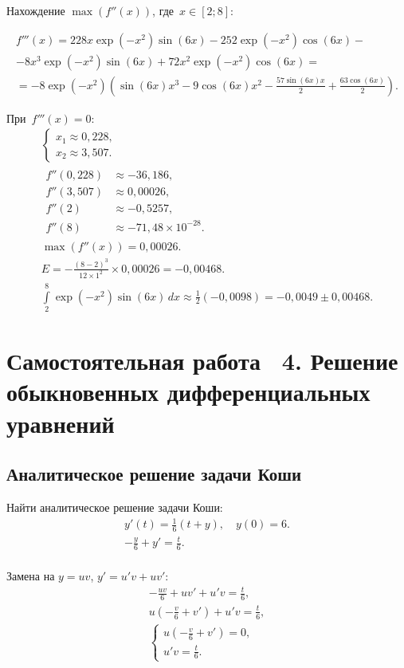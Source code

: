 \documentclass[10pt, a4paper, titlepage]{article}
\begin{document}
Нахождение $\max(f''(x))$, где~$x\in[2; 8]$:

\begin{multline*}
    f'''(x)=228x\exp(-x^2)\sin(6x)-252\exp(-x^2)\cos(6x)- \\
    -8x^3\exp(-x^2)\sin(6x)+72x^2\exp(-x^2)\cos(6x) = \\
    = -8\exp(-x^2)\left(\sin(6x)x^3-9\cos(6x)x^2-\frac{57\sin(6x)x}{2}+\frac{63\cos(6x)}{2}\right) .
\end{multline*}

При~$f'''(x) = 0$:
\begin{gather*}
    \begin{cases}
        x_1 \approx 0,228 ,\\
        x_2 \approx 3,507 .
    \end{cases} 
    \\
    \begin{aligned}
        f''(0,228) &\approx -36,186 ,\\
        f''(3,507) &\approx 0,00026 ,\\
        f''(2) &\approx -0,5257 ,\\
        f''(8) &\approx -71,48\times10^{-28} .
    \end{aligned}
    \\
    \max(f''(x))=0,00026 .\\
    E=-\frac{(8-2)^3}{12\times1^2}\times0,00026=-0,00468 .\\
    \int\limits_2^8 \exp(-x^2)\sin(6x)\,dx \approx \frac{1}{2}(-0,0098)=-0,0049\pm0,00468 .
\end{gather*}


\clearpage
\section{Самостоятельная работа \textnumero~4. Решение обыкновенных дифференциальных уравнений}

\subsection*{Аналитическое решение задачи Коши}

Найти аналитическое решение задачи Коши:
\begin{gather*}
    y'(t)=\frac{1}{6}(t+y), \quad y(0)=6 .\\
    -\frac{y}{6}+y'=\frac{t}{6} .\\
\end{gather*}

Замена на $y=uv$, $y'=u'v+uv'$:
\begin{gather*}
    -\frac{uv}{6}+uv'+u'v=\frac{t}{6} ,\\
    u\left(-\frac{v}{6}+v'\right)+u'v = \frac{t}{6} ,\\
    \begin{cases}
        u\left(-\frac{v}{6}+v'\right)=0 ,\\
        u'v=\frac{t}{6} .
    \end{cases}
\end{gather*}
\end{document}
